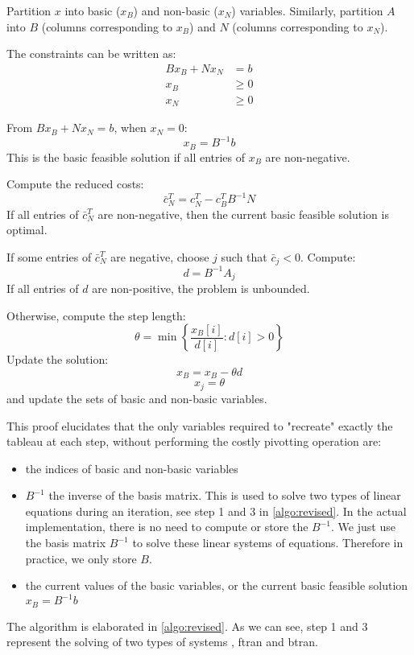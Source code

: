 Partition \( x \) into basic (\( x_B \)) and non-basic (\( x_N \)) variables.
Similarly, partition \( A \) into \( B \) (columns corresponding to \( x_B \))
and \( N \) (columns corresponding to \( x_N \)).

The constraints can be written as:
\begin{align*}
    Bx_B + Nx_N & = b    \\
    x_B         & \geq 0 \\
    x_N         & \geq 0
\end{align*}

From \( Bx_B + Nx_N = b \), when \( x_N = 0 \):
\[ x_B = B^{-1}b \]
This is the basic feasible solution if all entries of \( x_B \) are non-negative.

Compute the reduced costs:
\[ \bar{c}_N^T = c_N^T - c_B^T B^{-1} N \]
If all entries of \( \bar{c}_N^T \) are non-negative,
then the current basic feasible solution is optimal.

If some entries of \( \bar{c}_N^T \) are negative,
choose \( j \) such that \( \bar{c}_j < 0 \). Compute:
\[ d = B^{-1} A_j \]
If all entries of \( d \) are non-positive, the problem is unbounded.

Otherwise, compute the step length:
\[ \theta = \min \left\{ \frac{x_B[i]}{d[i]} : d[i] > 0 \right\} \]
Update the solution:
\[ x_B = x_B - \theta d \]
\[ x_j = \theta \]
and update the sets of basic and non-basic variables.

This proof elucidates that the only variables required to "recreate" exactly the tableau at
each step, without performing the costly pivotting operation are:
\begin{itemize}
    \item the indices of basic and non-basic variables
    \item $B^{-1}$ the inverse of the basis matrix. This is used to solve two types of linear equations
          during an iteration, see step 1 and 3 in \ref{algo:revised}.
          In the actual implementation, there is no need to compute or store the $B^{-1}$.
          We just use the basis matrix $B^{-1}$ to solve these linear systems of
          equations. Therefore in practice, we only store $B$.
    \item the current values of the basic variables, or the current basic feasible solution $x_B = B^{-1}b$
\end{itemize}

The algorithm is elaborated in \ref{algo:revised}. As we can see, step 1 and 3 represent the solving of
two types of systems , \gls{ftran} and \gls{btran}.

